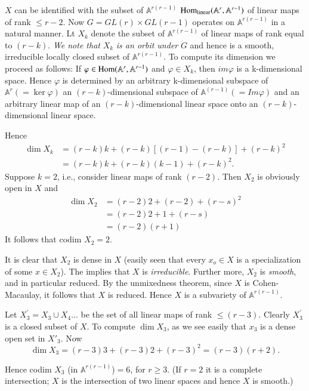 {\medskip
{} $X$ can be identified with the subset of 
$\mathbb{A}^{r(r-1)}$ $\operatorname{Hom}_{\text{linear}}(\mathbb{A}^{r}, \mathbb{A}^{r-1})$
of linear maps of rank $\le r-2$. Now $G=GL(r)\times GL(r-1)$ operates
on $\mathbb{A}^{r(r-1)}$ in a natural manner. Lt $X_k$ denote the
subset of $\mathbb{A}^{r(r-1)}$ of linear maps of rank equal to
$(r-k)$. {\em We note that} $X_k$ {\em is an orbit under} $G$ and
hence is a smooth, irreducible locally closed subset of
$\mathbb{A}^{r(r-1)}$. To compute its dimension we proceed as follows:
If $\varphi\in\operatorname{Hom}(\mathbb{A}^{r}, \mathbb{A}^{r-1})$\pageoriginale
and $\varphi\in X_k$, then $im\varphi$ is a k-dimensional space. Hence
$\varphi$ is determined by an arbitrary k-dimensional subspace of
$\mathbb{A}^{r}(=\ker\varphi)$ an $(r-k)$-dimensional subspace of
$\mathbb{A}^{(r-1)}(=Im\varphi)$ and an arbitrary linear map of an
$(r-k)$-dimensional linear space onto an $(r-k)$-dimensional linear
space. 

Hence
\begin{align*}
\dim X_k&=(r-k)k+(r-k)[(r-1)-(r-k)]+(r-k)^{2}\\
&=(r-k)k+(r-k)(k-1)+(r-k)^{2}.
\end{align*}
Suppose $k=2$, i.e., consider linear maps of rank $(r-2)$. Then $X_2$ is obviously open in $X$ and
\begin{align*}
\dim X_2&=(r-2)2+(r-2)+(r-s)^{2}\\
&=(r-2)2+1+(r-s)\\
&=(r-2)(r+1)
\end{align*}
It follows that codim $X_2=2$.

It is clear that $X_2$ is dense in $X$ (easily seen that every $x_o\in
X$ is a specialization of some $x\in X_2$). The implies that $X$ is
{\em irreducible}. Further more, $X_2$ is {\em smooth}, and in
particular reduced. By the unmixedness theorem, since $X$ is
Cohen-Macaulay, it follows that $X$ is reduced. Hence $X$ is a
subvariety of $\mathbb{A}^{r(r-1)}$. 

Let $X^{'}_3=X_3\cup X_4\ldots$ be the set of all linear maps of rank
$\le(r-3)$. Clearly $X^{'}_3$ is a closed subset of $X$. To compute
$\dim X_3$, as we see easily that $x_3$ is a dense open set in
$X{'}_3$. Now  
$$
\dim X_3=(r-3)3+(r-3)2+(r-3)^{2}=(r-3)(r+2).
$$

Hence codim $X_3$ (in $\mathbb{A}^{r(r-1)}$)$=6$, for $r\ge3$. (If
$r=2$ it is a complete intersection; $X$ is the intersection of two
linear spaces and hence $X$ is smooth.) 

}
